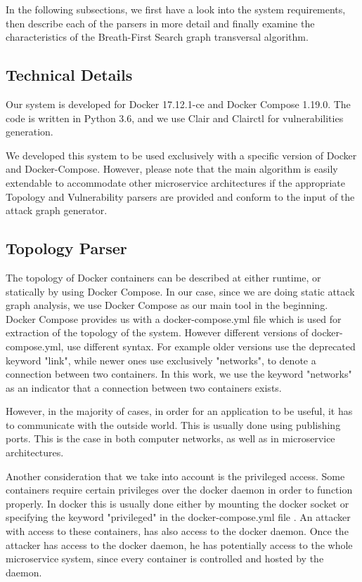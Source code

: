 In the following subsections, we first have a look into the system requirements, then describe each of the parsers in more detail and finally examine the characteristics of the Breath-First Search graph transversal algorithm.

\subsection{Technical Details}
\label{chap:technical}

Our system is developed for Docker 17.12.1-ce and Docker Compose 1.19.0. The code is written in Python 3.6, and we use Clair \cite{clair} and Clairctl \cite{clairctl} for vulnerabilities generation.

We developed this system to be used exclusively with a specific version of Docker and Docker-Compose. However, please note that the main algorithm is easily extendable to accommodate other microservice architectures if the appropriate Topology and Vulnerability parsers are provided and conform to the input of the attack graph generator.

\subsection{Topology Parser}
\label{chap:topology_p}

The topology of Docker containers can be described at either runtime, or statically by using Docker Compose. In our case, since we are doing static attack graph analysis, we use Docker Compose as our main tool in the beginning. Docker Compose provides us with a docker-compose.yml file which is used for extraction of the topology of the system. However different versions of docker-compose.yml, use different syntax. For example older versions use the deprecated keyword "link", while newer ones use exclusively "networks", to denote a connection between two containers. In this work, we use the keyword "networks" as an indicator that a connection between two containers exists.

However, in the majority of cases, in order for an application to be useful, it has to communicate with the outside world. This is usually done using publishing ports. This is the case in both computer networks, as well as in microservice architectures.

Another consideration that we take into account is the privileged access. Some containers require certain privileges over the docker daemon in order to function properly. In docker this is usually done either by mounting the docker socket or specifying the keyword "privileged" in the docker-compose.yml file . An attacker with access to these containers, has also access to the docker daemon. Once the attacker has access to the docker daemon, he has potentially access to the whole microservice system, since every container is controlled and hosted by the daemon.





